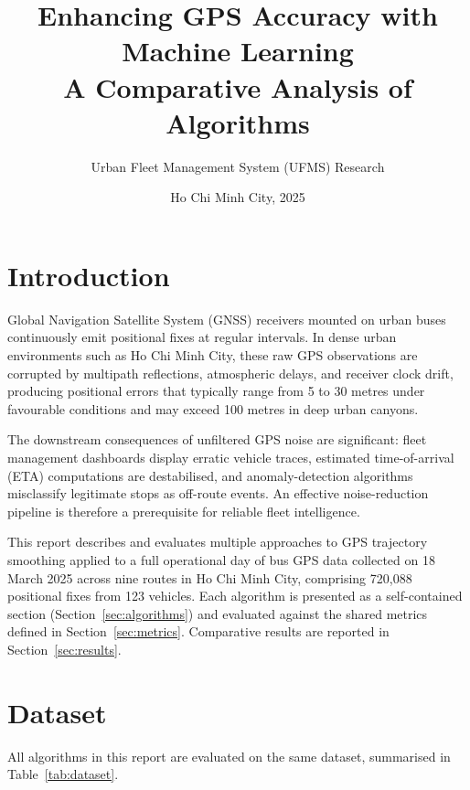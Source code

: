 \documentclass[12pt, a4paper]{article}
\title{%
    \textbf{Enhancing GPS Accuracy with Machine Learning} \\[0.5em]
    \large A Comparative Analysis of Algorithms
}
\author{Urban Fleet Management System (UFMS) Research}
\date{Ho Chi Minh City, 2025}
\begin{document}
\maketitle
\tableofcontents
\newpage

\section{Introduction}

Global Navigation Satellite System (GNSS) receivers mounted on urban buses
continuously emit positional fixes at regular intervals. In dense urban
environments such as Ho Chi Minh City, these raw GPS observations are corrupted
by multipath reflections, atmospheric delays, and receiver clock drift,
producing positional errors that typically range from 5 to 30 metres under
favourable conditions and may exceed 100 metres in deep urban canyons.

The downstream consequences of unfiltered GPS noise are significant: fleet
management dashboards display erratic vehicle traces, estimated time-of-arrival
(ETA) computations are destabilised, and anomaly-detection algorithms
misclassify legitimate stops as off-route events. An effective noise-reduction
pipeline is therefore a prerequisite for reliable fleet intelligence.

This report describes and evaluates multiple approaches to GPS trajectory
smoothing applied to a full operational day of bus GPS data collected on
18 March 2025 across nine routes in Ho Chi Minh City, comprising 720,088
positional fixes from 123 vehicles. Each algorithm is presented as a
self-contained section (Section~\ref{sec:algorithms}) and evaluated against
the shared metrics defined in Section~\ref{sec:metrics}. Comparative results
are reported in Section~\ref{sec:results}.

\section{Dataset}
\label{sec:dataset}

All algorithms in this report are evaluated on the same dataset, summarised
in Table~\ref{tab:dataset}.
\end{document}
